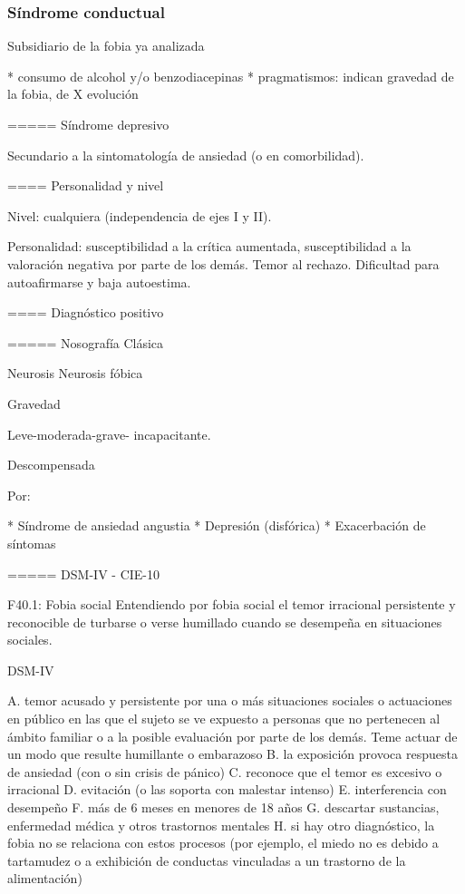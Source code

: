 \subsubsection*{Síndrome conductual}
Subsidiario de la fobia ya analizada

* consumo de alcohol y/o benzodiacepinas
* pragmatismos: indican gravedad de la fobia, de X evolución

===== Síndrome depresivo

Secundario a la sintomatología de ansiedad (o en comorbilidad).

==== Personalidad y nivel

Nivel: cualquiera (independencia de ejes I y II).

Personalidad: susceptibilidad a la crítica aumentada, susceptibilidad a la valoración negativa por parte de los demás. Temor al rechazo. Dificultad para autoafirmarse y baja autoestima.

==== Diagnóstico positivo

===== Nosografía Clásica

Neurosis
Neurosis fóbica

Gravedad

Leve-moderada-grave- incapacitante.

Descompensada

Por:

* Síndrome de ansiedad angustia
* Depresión (disfórica)
* Exacerbación de síntomas

===== DSM-IV - CIE-10

F40.1: Fobia social Entendiendo por fobia social el temor irracional persistente y reconocible de turbarse o verse humillado cuando se desempeña en situaciones sociales.

DSM-IV

A. temor acusado y persistente por una o más situaciones sociales o actuaciones en público en las que el sujeto se ve expuesto a personas que no pertenecen al ámbito familiar o a la posible evaluación por parte de los demás. Teme actuar de un modo que resulte humillante o embarazoso
B. la exposición provoca respuesta de ansiedad (con o sin crisis de pánico)
C. reconoce que el temor es excesivo o irracional
D. evitación (o las soporta con malestar intenso)
E. interferencia con desempeño
F. más de 6 meses en menores de 18 años
G. descartar sustancias, enfermedad médica y otros trastornos mentales
H. si hay otro diagnóstico, la fobia no se relaciona con estos procesos (por ejemplo, el miedo no es debido a tartamudez o a exhibición de conductas vinculadas a un trastorno de la alimentación)

